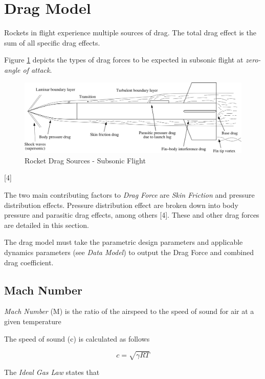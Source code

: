 \documentclass[]{article}
\begin{document}
\section{Drag Model}\label{drag-model}

Rockets in flight experience multiple sources of drag. The total drag
effect is the sum of all specific drag effects.

Figure \ref{rocket_drag_sources_label} depicts the types of drag forces
to be expected in subsonic flight at \emph{zero-angle of attack}.

\begin{figure}[htbp]
\centering
\includegraphics{images/drag_sources_niskanen2013.png}
\caption{Rocket Drag Sources - Subsonic Flight
\label{rocket_drag_sources_label}}
\end{figure}

{[}4{]}

The two main contributing factors to \emph{Drag Force} are \emph{Skin
Friction} and pressure distribution effects. Pressure distribution
effect are broken down into body pressure and parasitic drag effects,
among others {[}4{]}. These and other drag forces are detailed in this
section.

The drag model must take the parametric design parameters and applicable
dynamics parameters (see \emph{Data Model}) to output the Drag Force and
combined drag coefficient.

\subsection{Mach Number}\label{mach-number}

\emph{Mach Number} (M) is the ratio of the airspeed to the speed of
sound for air at a given temperature

The speed of sound (c) is calculated as follows

\begin{equation}
c = \sqrt{\gamma R T } 
\end{equation}

The \emph{Ideal Gas Law} states that
\end{document}
